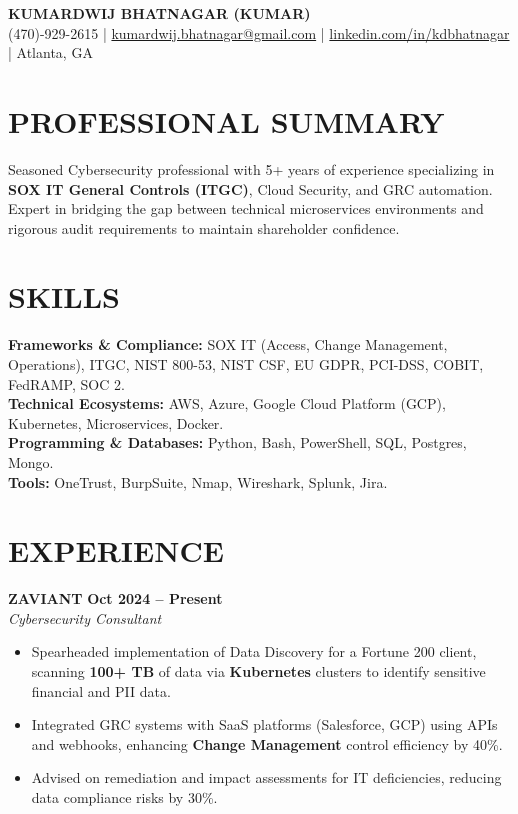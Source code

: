 \documentclass[10pt, letterpaper]{article}
\begin{document}
\begin{center}
    {\Huge \textbf{KUMARDWIJ BHATNAGAR (KUMAR)}} \\
    \vspace{4pt}
    (470)-929-2615 | \href{mailto:kumardwij.bhatnagar@gmail.com}{kumardwij.bhatnagar@gmail.com} | \href{https://linkedin.com/in/kdbhatnagar}{linkedin.com/in/kdbhatnagar} | Atlanta, GA
\end{center}

\section{PROFESSIONAL SUMMARY}
Seasoned Cybersecurity professional with 5+ years of experience specializing in \textbf{SOX IT General Controls (ITGC)}, Cloud Security, and GRC automation. Expert in bridging the gap between technical microservices environments and rigorous audit requirements to maintain shareholder confidence.

\section{SKILLS}
\textbf{Frameworks \& Compliance:} SOX IT (Access, Change Management, Operations), ITGC, NIST 800-53, NIST CSF, EU GDPR, PCI-DSS, COBIT, FedRAMP, SOC 2. \\
\textbf{Technical Ecosystems:} AWS, Azure, Google Cloud Platform (GCP), Kubernetes, Microservices, Docker. \\
\textbf{Programming \& Databases:} Python, Bash, PowerShell, SQL, Postgres, Mongo. \\
\textbf{Tools:} OneTrust, BurpSuite, Nmap, Wireshark, Splunk, Jira.

\section{EXPERIENCE}

\textbf{ZAVIANT} \hfill \textbf{Oct 2024 -- Present} \\
\textit{Cybersecurity Consultant} \hfill \textbf{}
\begin{itemize}
    \item Spearheaded implementation of Data Discovery for a Fortune 200 client, scanning \textbf{100+ TB} of data via \textbf{Kubernetes} clusters to identify sensitive financial and PII data.
    \item Integrated GRC systems with SaaS platforms (Salesforce, GCP) using APIs and webhooks, enhancing \textbf{Change Management} control efficiency by 40\%.
    \item Advised on remediation and impact assessments for IT deficiencies, reducing data compliance risks by 30\%.
\end{itemize}
\end{document}
